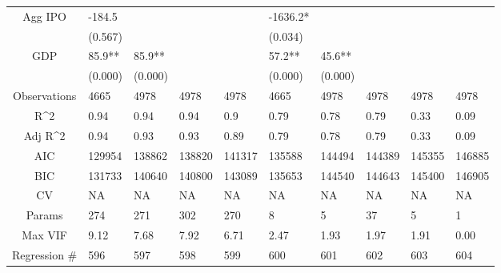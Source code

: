\documentclass{article}
\begin{document}
\begin{table}[H]
\begin{tabular}{|clllllllll|}
  Agg IPO & -184.5 &  &  &  & -1636.2* &  &  &  &  \\ 
   & (0.567) &  &  &  & (0.034) &  &  &  &  \\ 
  GDP & 85.9** & 85.9** &  &  & 57.2** & 45.6** &  &  &  \\ 
   & (0.000) & (0.000) &  &  & (0.000) & (0.000) &  &  &  \\ 
  \hline 
 Observations & 4665 & 4978 & 4978 & 4978 & 4665 & 4978 & 4978 & 4978 & 4978 \\ 
  R^2 & 0.94 & 0.94 & 0.94 & 0.9 & 0.79 & 0.78 & 0.79 & 0.33 & 0.09 \\ 
  Adj R^2 & 0.94 & 0.93 & 0.93 & 0.89 & 0.79 & 0.78 & 0.79 & 0.33 & 0.09 \\ 
  AIC & 129954 & 138862 & 138820 & 141317 & 135588 & 144494 & 144389 & 145355 & 146885 \\ 
  BIC & 131733 & 140640 & 140800 & 143089 & 135653 & 144540 & 144643 & 145400 & 146905 \\ 
  CV & NA & NA & NA & NA & NA & NA & NA & NA & NA \\ 
  Params & 274 & 271 & 302 & 270 & 8 & 5 & 37 & 5 & 1 \\ 
  Max VIF & 9.12 & 7.68 & 7.92 & 6.71 & 2.47 & 1.93 & 1.97 & 1.91 & 0.00 \\ 
  Regression \# & 596 & 597 & 598 & 599 & 600 & 601 & 602 & 603 & 604 \\ 
   \hline
\end{tabular}
 
\end{table}
\end{document}
